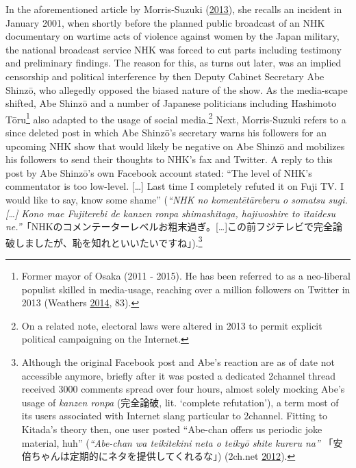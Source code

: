\documentclass[10pt,british,A4paper,oneside]{memoir}
\begin{document}
In the aforementioned article by Morris-Suzuki
(\protect\hyperlink{ref-morris-suzuki_freedom_2013}{2013}), she recalls
an incident in January 2001, when shortly before the planned public
broadcast of an NHK documentary on wartime acts of violence against
women by the Japan military, the national broadcast service NHK was
forced to cut parts including testimony and preliminary findings. The
reason for this, as turns out later, was an implied censorship and
political interference by then Deputy Cabinet Secretary Abe Shinzō, who
allegedly opposed the biased nature of the show. As the media-scape
shifted, Abe Shinzō and a number of Japanese politicians including
Hashimoto Tōru\footnote{Former mayor of Osaka (2011 - 2015). He has been
  referred to as a neo-liberal populist skilled in media-usage, reaching
  over a million followers on Twitter in 2013 (Weathers
  \protect\hyperlink{ref-weathers_reformer_2014}{2014}, 83).} also
adapted to the usage of social media.\footnote{On a related note,
  electoral laws were altered in 2013 to permit explicit political
  campaigning on the Internet.} Next, Morris-Suzuki refers to a since
deleted post in which Abe Shinzō's secretary warns his followers for an
upcoming NHK show that would likely be negative on Abe Shinzō and
mobilizes his followers to send their thoughts to NHK's fax and Twitter.
A reply to this post by Abe Shinzō's own Facebook account stated: ``The
level of NHK's commentator is too low-level. {[}\ldots{}{]} Last time I
completely refuted it on Fuji TV. I would like to say, know some shame''
(\emph{``NHK no komentētāreberu o somatsu sugi.{[}\ldots{}{]} Kono mae
Fujiterebi de kanzen ronpa shimashitaga, hajiwoshire to ītaidesu
ne.''}「NHKのコメンテーターレベルお粗末過ぎ。{[}\ldots{}{]}この前フジテレビで完全論破しましたが、恥を知れといいたいですね」).\footnote{Although
  the original Facebook post and Abe's reaction are as of date not
  accessible anymore, briefly after it was posted a dedicated 2channel
  thread received 3000 comments spread over four hours, almost solely
  mocking Abe's usage of \emph{kanzen ronpa} (完全論破, lit. `complete
  refutation'), a term most of its users associated with Internet slang
  particular to 2channel. Fitting to Kitada's theory then, one user
  posted ``Abe-chan offers us periodic joke material, huh''
  (\emph{``Abe-chan wa teikitekini neta o teikyō shite kureru na''}
  「安倍ちゃんは定期的にネタを提供してくれるな」) (2ch.net
  \protect\hyperlink{ref-2ch.net_eng._2012}{2012}).}
\end{document}
